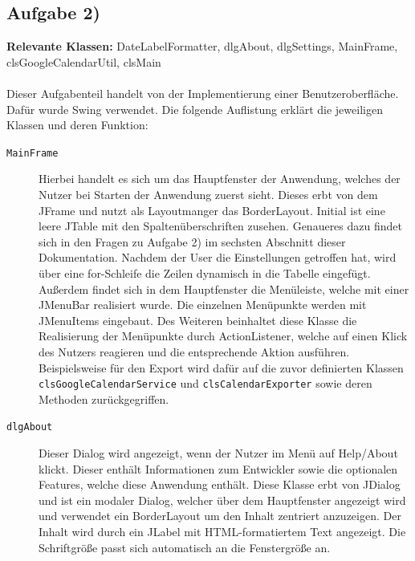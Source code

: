 \documentclass[a4paper]{article}
\begin{document}
	\subsection{Aufgabe 2)}
	\textbf{Relevante Klassen:} DateLabelFormatter, dlgAbout, dlgSettings, MainFrame, clsGoogleCalendarUtil, clsMain
	\\
	\\
	Dieser Aufgabenteil handelt von der Implementierung einer Benutzeroberfläche. Dafür wurde Swing verwendet. Die folgende Auflistung erklärt die jeweiligen Klassen und deren Funktion:
	\begin{description}
		
		\item[\texttt{MainFrame}] Hierbei handelt es sich um das Hauptfenster der Anwendung, welches der Nutzer bei Starten der Anwendung zuerst sieht. Dieses erbt von dem JFrame und nutzt als Layoutmanger das BorderLayout. Initial ist eine leere JTable mit den Spaltenüberschriften zusehen. Genaueres dazu findet sich in den Fragen zu Aufgabe 2) im sechsten Abschnitt dieser Dokumentation. Nachdem der User die Einstellungen getroffen hat, wird über eine for-Schleife die Zeilen dynamisch in die Tabelle eingefügt. Außerdem findet sich in dem Hauptfenster die Menüleiste, welche mit einer JMenuBar realisiert wurde. Die einzelnen Menüpunkte werden mit JMenuItems eingebaut. Des Weiteren beinhaltet diese Klasse die Realisierung der Menüpunkte durch ActionListener, welche auf einen Klick des Nutzers reagieren und die entsprechende Aktion ausführen. Beispielsweise für den Export wird dafür auf die zuvor definierten Klassen \texttt{clsGoogleCalendarService} und \texttt{clsCalendarExporter} sowie deren Methoden zurückgegriffen.
		
		\item[\texttt{dlgAbout}] Dieser Dialog wird angezeigt, wenn der Nutzer im Menü auf Help/About klickt. Dieser enthält Informationen zum Entwickler sowie die optionalen Features, welche diese Anwendung enthält. Diese Klasse erbt von JDialog und ist ein modaler Dialog, welcher über dem Hauptfenster angezeigt wird und verwendet ein BorderLayout um den Inhalt zentriert anzuzeigen. Der Inhalt wird durch ein JLabel mit HTML-formatiertem Text angezeigt. Die Schriftgröße passt sich automatisch an die Fenstergröße an.
		

\end{description}
\end{document}
